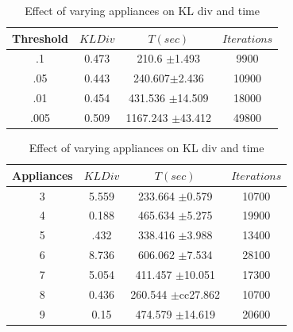 \documentclass{sig-alternate}
\begin{document}
\begin{table}[htdp]
\parbox{.51\linewidth}{
\centering
\begin{tabular}{| c | c | c | c |}
\hline
Threshold & $KL Div$ & $T(sec)$ & $Iterations$ \\
\hline
.1 & 0.473 & 210.6 $\pm$1.493 & 9900 \\
.05 & 0.443 & 240.607$\pm$2.436 & 10900 \\
.01 & 0.454 & 431.536 $\pm$14.509 & 18000 \\
.005 & 0.509 & 1167.243 $\pm$43.412 & 49800 \\
\hline
\end{tabular}
\caption{Effect of varying min threshold on KL div and time}
\label{table:threshold1}
}
\hfill
\parbox{.51\linewidth}{
\centering
\begin{tabular}{| c | c | c | c |}
\hline
Appliances & $KL Div$ & $T(sec)$ & $Iterations$ \\
\hline
3 & 5.559 & 233.664 $\pm$0.579 & 10700 \\
4 & 0.188 & 465.634 $\pm$5.275 & 19900 \\
5 & .432 & 338.416 $\pm$3.988  & 13400 \\
6 & 8.736 & 606.062 $\pm$7.534 & 28100 \\
7 & 5.054 & 411.457 $\pm$10.051 & 17300 \\
8 & 0.436 & 260.544 $\pm$cc27.862 & 10700 \\
9 & 0.15 & 474.579 $\pm$14.619 & 20600 \\
\hline
\end{tabular}
\caption{Effect of varying appliances on KL div and time}
\label{table:appliance1}
}
\end{table}
\end{document}
